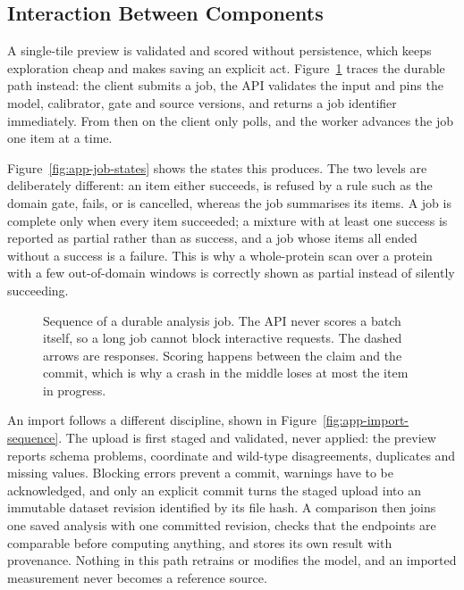 \subsection{Interaction Between Components}
A single-tile preview is validated and scored without persistence, which keeps exploration cheap and
makes saving an explicit act. Figure~\ref{fig:app-job-sequence} traces the durable path instead: the
client submits a job, the API validates the input and pins the model, calibrator, gate and source
versions, and returns a job identifier immediately. From then on the client only polls, and the
worker advances the job one item at a time.

Figure~\ref{fig:app-job-states} shows the states this produces. The two levels are deliberately
different: an item either succeeds, is refused by a rule such as the domain gate, fails, or is
cancelled, whereas the job summarises its items. A job is complete only when every item succeeded;
a mixture with at least one success is reported as partial rather than as success, and a job whose
items all ended without a success is a failure. This is why a whole-protein scan over a protein with
a few out-of-domain windows is correctly shown as partial instead of silently succeeding.

\begin{figure}[htbp]
  \centering
  
  \caption[Sequence of a durable analysis job]{Sequence of a durable analysis job. The API never scores a batch itself, so a long job
  cannot block interactive requests. The dashed arrows are responses. Scoring happens between the
  claim and the commit, which is why a crash in the middle loses at most the item in progress.}
  \label{fig:app-job-sequence}
\end{figure}

An import follows a different discipline, shown in Figure~\ref{fig:app-import-sequence}. The upload
is first staged and validated, never applied: the preview reports schema problems, coordinate and
wild-type disagreements, duplicates and missing values. Blocking errors prevent a commit, warnings
have to be acknowledged, and only an explicit commit turns the staged upload into an immutable
dataset revision identified by its file hash. A comparison then joins one saved analysis with one
committed revision, checks that the endpoints are comparable before computing anything, and stores
its own result with provenance. Nothing in this path retrains or modifies the model, and an imported
measurement never becomes a reference source.


